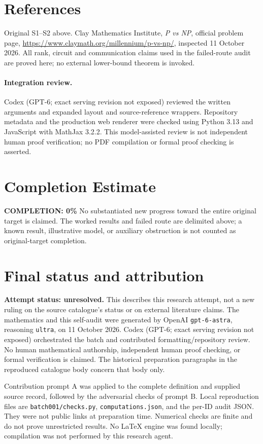 \documentclass[11pt,a4paper]{article}
\begin{document}
\section{References}
Original S1--S2 above. Clay Mathematics Institute, \emph{P vs NP}, official problem page, \url{https://www.claymath.org/millennium/p-vs-np/}, inspected 11 October 2026. All rank, circuit and communication claims used in the failed-route audit are proved here; no external lower-bound theorem is invoked.


\paragraph{Integration review.} Codex (GPT-6; exact serving revision not exposed) reviewed the written arguments and expanded layout and source-reference wrappers. Repository metadata and the production web renderer were checked using Python 3.13 and JavaScript with MathJax 3.2.2. This model-assisted review is not independent human proof verification; no PDF compilation or formal proof checking is asserted.

\section{Completion Estimate}
\noindent\textbf{COMPLETION: 0\%}
No substantiated new progress toward the entire original target is claimed. The worked results and failed route are delimited above; a known result, illustrative model, or auxiliary obstruction is not counted as original-target completion.

\section{Final status and attribution}
\textbf{Attempt status: unresolved.} This describes this research attempt, not a new ruling on the source catalogue's status or on external literature claims.
The mathematics and this self-audit were generated by OpenAI \texttt{gpt-6-astra}, reasoning \texttt{ultra}, on 11 October 2026. Codex (GPT-6; exact serving revision not exposed) orchestrated the batch and contributed formatting/repository review. No human mathematical authorship, independent human proof checking, or formal verification is claimed. The historical preparation paragraphs in the reproduced catalogue body concern that body only.

Contribution prompt A was applied to the complete definition and supplied source record, followed by the adversarial checks of prompt B. Local reproduction files are \texttt{batch001/checks.py}, \texttt{computations.json}, and the per-ID audit JSON. They were not public links at preparation time. Numerical checks are finite and do not prove unrestricted results. No LaTeX engine was found locally; compilation was not performed by this research agent.
\end{document}
